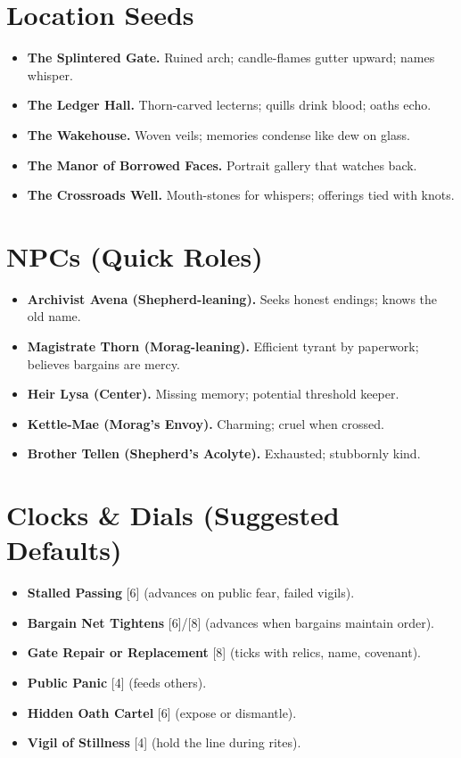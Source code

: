 \documentclass[11pt]{article}
\newcommand{\clock}[1]{\textsc{[#1]}}
\begin{document}
\section*{Location Seeds}
\begin{itemize}
  \item \textbf{The Splintered Gate.} Ruined arch; candle-flames gutter upward; names whisper.
  \item \textbf{The Ledger Hall.} Thorn-carved lecterns; quills drink blood; oaths echo.
  \item \textbf{The Wakehouse.} Woven veils; memories condense like dew on glass.
  \item \textbf{The Manor of Borrowed Faces.} Portrait gallery that watches back.
  \item \textbf{The Crossroads Well.} Mouth-stones for whispers; offerings tied with knots.
\end{itemize}

\section*{NPCs (Quick Roles)}
\begin{itemize}
  \item \textbf{Archivist Avena (Shepherd-leaning).} Seeks honest endings; knows the old name.
  \item \textbf{Magistrate Thorn (Morag-leaning).} Efficient tyrant by paperwork; believes bargains are mercy.
  \item \textbf{Heir Lysa (Center).} Missing memory; potential threshold keeper.
  \item \textbf{Kettle-Mae (Morag's Envoy).} Charming; cruel when crossed.
  \item \textbf{Brother Tellen (Shepherd's Acolyte).} Exhausted; stubbornly kind.
\end{itemize}

\section*{Clocks \& Dials (Suggested Defaults)}
\begin{itemize}
  \item \textbf{Stalled Passing} \clock{6} (advances on public fear, failed vigils).
  \item \textbf{Bargain Net Tightens} \clock{6}/\clock{8} (advances when bargains maintain order).
  \item \textbf{Gate Repair or Replacement} \clock{8} (ticks with relics, name, covenant).
  \item \textbf{Public Panic} \clock{4} (feeds others).
  \item \textbf{Hidden Oath Cartel} \clock{6} (expose or dismantle).
  \item \textbf{Vigil of Stillness} \clock{4} (hold the line during rites).
\end{itemize}
\end{document}

